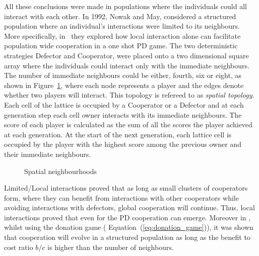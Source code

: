 All these conclusions were made in populations where the individuals could all
interact with each other. In 1992, Nowak and May, considered a structured population
where an individual's interactions were limited to its neighbours.
More specifically, in~\cite{Nowak1992b} they explored how local interaction
alone can facilitate population wide cooperation in a one shot PD game. The two
deterministic strategies Defector and Cooperator, were placed onto a two
dimensional square array where the individuals could interact only with the
immediate neighbours. The number of immediate neighbours could be either,
fourth, six or eight, as shown in Figure~\ref{fig:topologies}, where each node
represents a player and the edges denote whether two players will interact. This
topology is refereed to as \textit{spatial topology}. Each cell of the lattice is
occupied by a Cooperator or a Defector and at each generation step each cell owner
interacts with its immediate neighbours. The score of each player is calculated
as the sum of all the scores the player achieved at each generation. At the
start of the next generation, each lattice cell is occupied by the player with
the highest score among the previous owner and their immediate neighbours.

\begin{figure}[!hbtp]
    \centering
        \begin{subfigure}{.25\textwidth}
            
        \end{subfigure}
        \begin{subfigure}{.25\textwidth}\centering
            
         \end{subfigure}
         \begin{subfigure}{.25\textwidth}\centering
            
         \end{subfigure}
         \caption{Spatial neighbourhoods}\label{fig:topologies}
\end{figure}

Limited/Local interactions proved that as long as small clusters of cooperators form, where
they can benefit from interactions with other cooperators while avoiding
interactions with defectors, global cooperation will continue. Thus, local
interactions proved that even for the PD cooperation can emerge. Moreover in
\cite{Ohtsuki2006}, whilst using the donation game (
Equation~(\ref{eq:donation_game})), it was shown that cooperation will
evolve in a structured population as long as the benefit to cost ratio \(b / c\)
is higher than the number of neighbours.

